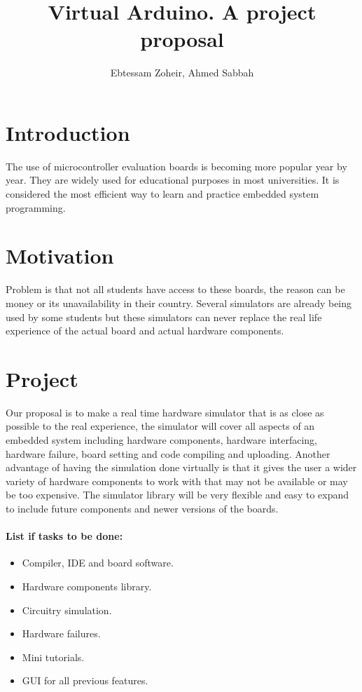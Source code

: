 \documentclass[a4paper]{article}
\author{Ebtessam Zoheir, Ahmed Sabbah}
\title{Virtual Arduino. A project proposal}
\begin{document}
\maketitle


\section*{Introduction}
The use of microcontroller evaluation boards is becoming more popular year by year. They are widely used for educational purposes in most universities. It is considered the most efficient way to learn and practice embedded system programming.

\section*{Motivation}
Problem is that not all students have access to these boards, the reason can be money or its unavailability in their country. Several simulators are already being used by some students but these simulators can never replace the real life experience of the actual board and actual hardware components.

\section*{Project}
Our proposal is to make a real time hardware simulator that is as close as possible to the real experience, the simulator will cover all aspects of an embedded system including hardware components, hardware interfacing, hardware failure, board setting and code compiling and uploading. Another advantage of having the simulation done virtually is that it gives the user a wider variety of hardware components to work with that may not be available or may be too expensive. The simulator library will be very flexible and easy to expand to include future components and newer versions of the boards.

\vspace*{\baselineskip}

\paragraph{List if tasks to be done:}

\begin{itemize}
\item Compiler, IDE and board software.
\item Hardware components library.
\item Circuitry simulation.
\item Hardware failures.
\item Mini tutorials.
\item GUI for all previous features.
\end{itemize}
\end{document}
